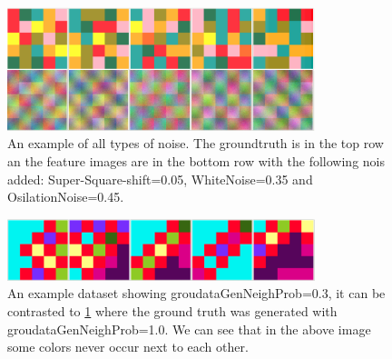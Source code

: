 \begin{figure}
  \centering
  \includegraphics[width=0.8\textwidth]{images/generatedData__none_color_20_150_0_01_8_0_05_0_35_0_45_1_0_10_11___.png}
  \caption{  An example of all types of noise. The groundtruth is in the top row an the feature images are in the bottom row with the following nois added: Super-Square-shift=0.05, WhiteNoise=0.35 and OsilationNoise=0.45.} 
  \label{fig:allNoise}
\end{figure} 

\begin{figure}
  \centering
  \includegraphics[width=0.8\textwidth]{images/DataGenNeighProb_0_3_seed13.png}
  \caption{  An example dataset showing groudataGenNeighProb=0.3, it can be contrasted to \ref{fig:allNoise} where the ground truth was generated with groudataGenNeighProb=1.0. We can see that in the above image some colors never occur next to each other.  } 
  \label{fig:dataGenNeighExp}
\end{figure} 


%
